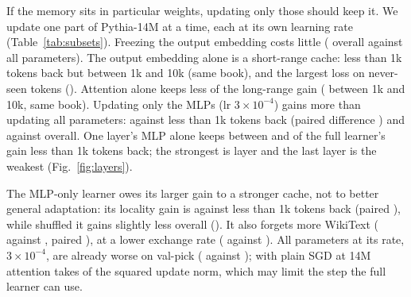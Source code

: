 \documentclass[times,twocolumn,final,authoryear]{elsarticle}
\begin{document}
If the memory sits in particular weights, updating only those should keep it.
We update one part of Pythia-14M at a time, each at its own learning rate (Table~\ref{tab:subsets}).
Freezing the output embedding costs little (\minusFullNoOutputAllPM{} overall against all parameters).
The output embedding alone is a short-range cache: \gainOutputOneKPM{} less than 1k tokens back but \gainOutputTenKSamePM{} between 1k and 10k (same book), and the largest loss on never-seen tokens (\gainOutputNeverPM{}).
Attention alone keeps less of the long-range gain (\gainAttentionTenKSamePM{} between 1k and 10k, same book).
Updating only the MLPs (lr $3\times10^{-4}$) gains more than updating all parameters: \gainMlpOneKPM{} against \gainInOrderOneK{} less than 1k tokens back (paired difference \minusFullMlpOneKPM{}) and \gainMlpAllPM{} against \gainInOrderAll{} overall.
One layer's MLP alone keeps between \layerShareOneKMin{} and \layerShareOneKMax{} of the full learner's gain less than 1k tokens back; the strongest is layer \layerBest{} and the last layer is the weakest (Fig.~\ref{fig:layers}).

The MLP-only learner owes its larger gain to a stronger cache, not to better general adaptation: its locality gain is \mvfMlpLocOneKPM{} against \mvfFullLocOneKPM{} less than 1k tokens back (paired \mvfDiffLocOneKPM{}), while shuffled it gains slightly less overall (\mvfDiffShuffledAllPM{}).
It also forgets more WikiText (\mvfMlpWikiPM{} against \mvfFullWikiPM{}, paired \mvfDiffWikiPM{}), at a lower exchange rate (\mvfMlpExchange{} against \mvfFullExchange{}).
All parameters at its rate, $3\times10^{-4}$, are already worse on val-pick (\valPickAllHigh{} against \valPickAll{}); with plain SGD at 14M attention takes \shareAttnFourteen{} of the squared update norm, which may limit the step the full learner can use.
\end{document}
